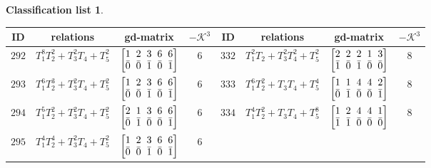 \documentclass[10pt,a4paper]{amsart}
\theoremstyle{definition}
\newtheorem{class-list}[thm]{Classification list}
\numberwithin{equation}{section}
\begin{document}
\begin{class-list}
\begin{table}[h!]\centering\setlength{\tabcolsep}{3.5pt}
\renewcommand{\arraystretch}{1.3}\small\tabulinesep=1mm
\begin{tabu}{c|c|c|c||c|c|c|c}
\hline
ID&relations&gd-matrix&$-\mathcal{K}^3$&ID&relations&gd-matrix&$-\mathcal{K}^3$
\\
\hline
${292}$&${T_{1}^{8}T_{2}^{2}+T_{3}^{2}T_{4}+T_{5}^{2}}$
&$\arraycolsep=1mm\begin{bmatrix}{1} & {2} & {3} & {6} & {6} \\ {\bar{0}} & {\bar{0}} & {\bar{1}} & {\bar{0}} & {\bar{1}}\end{bmatrix}$&${6}$
&${332}$&${T_{1}^{2}T_{2}+T_{3}^{2}T_{4}^{2}+T_{5}^{2}}$
&$\arraycolsep=1mm\begin{bmatrix}{2} & {2} & {2} & {1} & {3} \\ {\bar{1}} & {\bar{0}} & {\bar{1}} & {\bar{0}} & {\bar{0}}\end{bmatrix}$&${8}$
\\
\hline
${293}$&${T_{1}^{6}T_{2}^{3}+T_{3}^{2}T_{4}+T_{5}^{2}}$
&$\arraycolsep=1mm\begin{bmatrix}{1} & {2} & {3} & {6} & {6} \\ {\bar{0}} & {\bar{0}} & {\bar{1}} & {\bar{0}} & {\bar{1}}\end{bmatrix}$&${6}$
&${333}$&${T_{1}^{6}T_{2}^{2}+T_{3}T_{4}+T_{5}^{4}}$
&$\arraycolsep=1mm\begin{bmatrix}{1} & {1} & {4} & {4} & {2} \\ {\bar{0}} & {\bar{1}} & {\bar{0}} & {\bar{0}} & {\bar{1}}\end{bmatrix}$&${8}$
\\
\hline
${294}$&${T_{1}^{5}T_{2}^{2}+T_{3}^{2}T_{4}+T_{5}^{2}}$
&$\arraycolsep=1mm\begin{bmatrix}{2} & {1} & {3} & {6} & {6} \\ {\bar{0}} & {\bar{1}} & {\bar{0}} & {\bar{0}} & {\bar{1}}\end{bmatrix}$&${6}$
&${334}$&${T_{1}^{4}T_{2}^{2}+T_{3}T_{4}+T_{5}^{8}}$
&$\arraycolsep=1mm\begin{bmatrix}{1} & {2} & {4} & {4} & {1} \\ {\bar{1}} & {\bar{1}} & {\bar{0}} & {\bar{0}} & {\bar{0}}\end{bmatrix}$&${8}$
\\
\hline
${295}$&${T_{1}^{4}T_{2}^{4}+T_{3}^{2}T_{4}+T_{5}^{2}}$
&$\arraycolsep=1mm\begin{bmatrix}{1} & {2} & {3} & {6} & {6} \\ {\bar{0}} & {\bar{0}} & {\bar{1}} & {\bar{0}} & {\bar{1}}\end{bmatrix}$&${6}$

\end{tabu}
\end{table}
\end{class-list}
\end{document}
